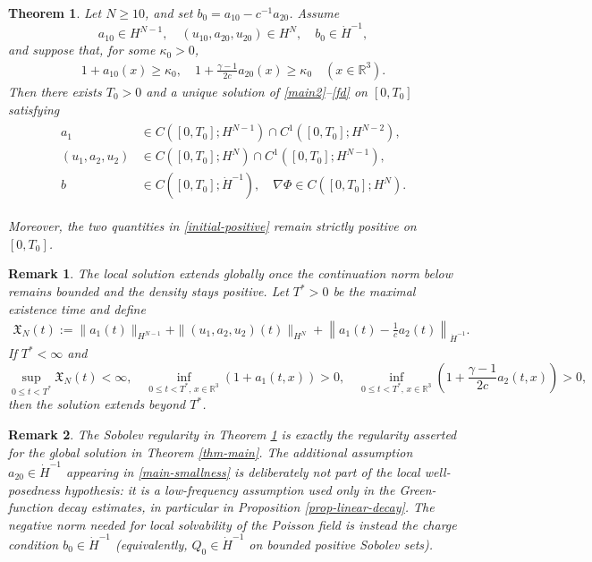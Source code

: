 \documentclass[10pt,reqno]{amsart}
\numberwithin{equation}{section}
\newtheorem{thm}{Theorem}[section]
\newtheorem{rem}{Remark}[section]
\begin{document}
\begin{thm} \label{thm-local}
Let {$N\geq 10$}, and set
$b_0=a_{10}-c^{-1}a_{20}$.  Assume
\[
a_{10}\in H^{N-1},\quad
(u_{10},a_{20},u_{20})\in H^N,\quad
b_0\in\dot H^{-1},
\]
and suppose that, for some $\kappa_0>0$,
\begin{align}\label{initial-positive}
1+a_{10}(x)\ge\kappa_0,
\quad
1+\frac{\gamma-1}{2c}a_{20}(x)\ge\kappa_0
\quad (x\in\mathbb R^3).
\end{align}
Then there exists $T_0>0$ and a unique solution of \eqref{main2}--\eqref{fd} on
$[0,T_0]$ satisfying
\begin{align}\label{local-class}
\begin{aligned}
a_1&\in C([0,T_0];H^{N-1})\cap C^1([0,T_0];H^{N-2}),\\
(u_1,a_2,u_2)&\in C([0,T_0];H^N)\cap C^1([0,T_0];H^{N-1}),\\
b&\in C([0,T_0];\dot H^{-1}),\quad \nabla\Phi \in C([0,T_0];H^N).
\end{aligned}
\end{align}

Moreover, the two quantities in \eqref{initial-positive} remain strictly positive on
$[0,T_0]$.
\end{thm}
\begin{rem} 
	The local solution extends globally once the continuation norm below remains bounded and the density stays positive.  Let $T^*>0$ be the maximal existence time and define
	\begin{align}\label{continuation-norm}
		\mathfrak X_N(t):=
		\|a_1(t)\|_{H^{N-1}}
		+\|(u_1,a_2,u_2)(t)\|_{H^N}
		+\left\|a_1(t)-\frac1c a_2(t)\right\|_{\dot H^{-1}}.
	\end{align}
	If $T^*<\infty$ and
	\begin{equation}\label{continuation-criterion}
		 \sup_{0\le t<T^*}\mathfrak X_N(t)<\infty,\quad \inf_{0\le t<T^*,\,x\in\mathbb R^3}(1+a_1(t,x))>0,\quad \inf_{0\le t<T^*,\,x\in\mathbb R^3}
		\left(1+\frac{\gamma-1}{2c}a_2(t,x)\right)>0,
	\end{equation}
	then the solution extends beyond $T^*$.
\end{rem}	


\begin{rem} 
The Sobolev regularity in Theorem \ref{thm-local} is exactly the regularity asserted for the global solution in Theorem \ref{thm-main}.  The additional assumption $a_{20}\in\dot H^{-1}$ appearing in \eqref{main-smallness} is deliberately not part of the local well-posedness hypothesis: it is a low-frequency assumption used only in the Green-function decay estimates, in particular in Proposition \ref{prop-linear-decay}. The negative norm needed for local solvability of the Poisson field is instead the charge condition $b_0\in\dot H^{-1}$ (equivalently, $Q_0\in\dot H^{-1}$ on bounded positive Sobolev sets).
\end{rem}
\end{document}
